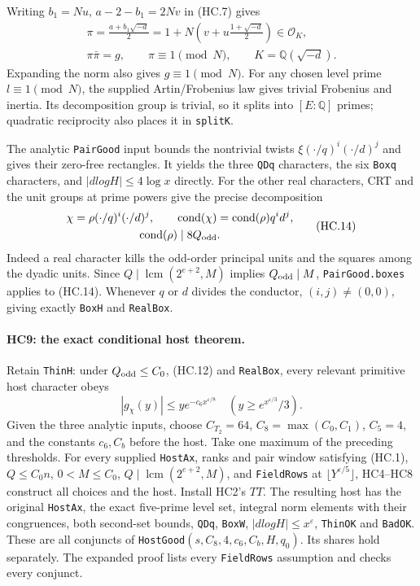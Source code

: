 \documentclass[11pt,a4paper]{article}
\numberwithin{equation}{section}
\theoremstyle{remark}\newtheorem{remark}[theorem]{Remark}
\begin{document}
Writing $b_1=Nu$, $a-2-b_1=2Nv$ in (HC.7) gives
\[
 \begin{gathered}
 \pi=\frac{a+b_1\sqrt{-d}}2
    =1+N\left(v+u\frac{1+\sqrt{-d}}2\right)\in\mathcal O_K,\\
 \pi\bar\pi=g,\qquad \pi\equiv1\pmod N,
 \qquad K=\mathbb Q(\sqrt{-d}).
 \end{gathered}                                      \tag{HC.13}
\]
Expanding the norm also gives $g\equiv1\pmod N$.
For any chosen level prime $l\equiv1\pmod N$, the supplied
Artin/Frobenius law gives trivial Frobenius and inertia. Its
decomposition group is trivial, so it splits into $[E:\mathbb Q]$
primes; quadratic reciprocity also places it in \texttt{splitK}.

The analytic \texttt{PairGood} input bounds the nontrivial twists
$\xi(\cdot/q)^i(\cdot/d)^j$ and gives their zero-free rectangles.
It yields the three \texttt{QDq} characters, the six
\texttt{Boxq} characters, and $|dlogH|\le4\log x$ directly.
For the other real characters, CRT and the unit groups at prime
powers give the precise decomposition
\[
 \begin{gathered}
 \chi=\rho(\cdot/q)^i(\cdot/d)^j,\qquad
 \operatorname{cond}(\chi)=\operatorname{cond}(\rho)q^id^j,\\
 \operatorname{cond}(\rho)\mid8Q_{\rm odd}.
 \end{gathered}                                      \tag{HC.14}
\]
Indeed a real character kills the odd-order principal units and
the squares among the dyadic units. Since
$Q\mid\operatorname{lcm}(2^{e+2},M)$ implies $Q_{\rm odd}\mid M$,
\texttt{PairGood.boxes} applies to (HC.14). Whenever $q$ or $d$
divides the conductor, $(i,j)\ne(0,0)$, giving exactly
\texttt{BoxH} and \texttt{RealBox}.

\paragraph{HC9: the exact conditional host theorem.}
Retain \texttt{ThinH}: under $Q_{\rm odd}\le C_0$, (HC.12) and
\texttt{RealBox}, every relevant primitive host character obeys
\[
 |g_\chi(y)|\le y e^{-c_6x^{\varepsilon/8}}
 \quad\left(y\ge e^{x^{\varepsilon/3}}/3\right).       \tag{HC.15}
\]
Given the three analytic inputs, choose
$C_{T_2}=64$, $C_8=\max(C_0,C_1)$, $C_5=4$, and the constants
$c_6,C_b$ before the host. Take one maximum of the preceding
thresholds. For every supplied \texttt{HostAx}, ranks and pair
window satisfying (HC.1), $Q\le C_0n$,
$0<M\le C_0$, $Q\mid\operatorname{lcm}(2^{e+2},M)$, and
\texttt{FieldRows} at $\lfloor Y^{\varepsilon/5}\rfloor$,
HC4--HC8 construct all choices and the host. Install HC2's $TT$.
The resulting host has the original \texttt{HostAx}, the exact
five-prime level set, integral norm elements with their congruences,
both second-set bounds, \texttt{QDq}, \texttt{BoxW},
$|dlogH|\le x^\varepsilon$, \texttt{ThinOK} and \texttt{BadOK}.
These are all conjuncts of
\texttt{HostGood}$(s,C_8,4,c_6,C_b,H,q_0)$.
Its shares hold separately. The expanded proof lists every
\texttt{FieldRows} assumption and checks every conjunct.
\end{document}
